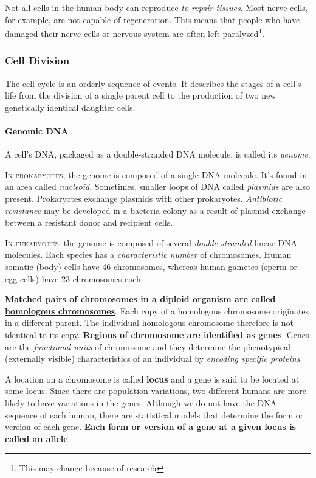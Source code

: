\documentclass[12pt]{article}
\begin{document}
Not all cells in the human body can reproduce \emph{to repair tissues}. Most nerve cells, for example, are not capable of regeneration. This means that people who have damaged their nerve cells or nervous system are often left paralyzed\footnote{This may change because of research}.
\subsubsection{Cell Division}
The cell cycle is an orderly sequence of events. It describes the stages of a cell's life from the division of a single parent cell to the production of two new genetically identical daughter cells.
\paragraph{Genomic DNA}
A cell's DNA, packaged as a double-stranded DNA molecule, is called its \emph{genome}. 

\lettrine[lines=2]{I}{n prokaryotes}, the genome is composed of a single DNA molecule. It's found in an area called \emph{nucleoid}. Sometimes, smaller loops of DNA called \emph{plasmids} are also present. Prokaryotes exchange plasmids with other prokaryotes. \emph{Antibiotic resistance} may be developed in a bacteria colony as a result of plasmid exchange between a resistant donor and recipient cells.

\lettrine[lines=2]{I}{n eukaryotes}, the genome is composed of several \emph{double stranded} linear DNA molecules. Each species has a \emph{characteristic number} of chromosomes. Human somatic (body) cells have 46 chromosomes, whereas human gametes (sperm or egg cells) have 23 chromosomes each.

\textbf{Matched pairs of chromosomes in a diploid organism are called \underline{homologous chromosomes}}. Each copy of a homologous chromosome originates in a different parent. The individual homologous chromosome therefore is not identical to its copy. \textbf{Regions of chromosome are identified as genes}. Genes are the \emph{functional units} of chromosome and they determine the phenotypical (externally visible) characteristics of an individual by \emph{encoding specific proteins}. 

A location on a chromosome is called \textbf{locus} and a gene is said to be located at some locus. Since there are population variations, two different humans are more likely to have variations in the genes. Although we do not have the DNA sequence of each human, there are statistical models that determine the form or version of each gene. \textbf{Each form or version of a gene at a given locus is called an allele}.
\end{document}
